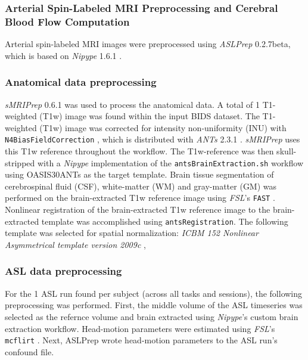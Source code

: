 \documentclass[]{article}
\date{}
\begin{document}
\hypertarget{arterial-spin-labeled-mri-preprocessing-and-cerebral-blood-flow-computation}{%
\subsubsection{Arterial Spin-Labeled MRI Preprocessing and Cerebral
Blood Flow
Computation}\label{arterial-spin-labeled-mri-preprocessing-and-cerebral-blood-flow-computation}}

Arterial spin-labeled MRI images were preprocessed using \emph{ASLPrep}
0.2.7beta, which is based on \emph{Nipype} 1.6.1 \citep{nipype}.

\hypertarget{anatomical-data-preprocessing}{%
\subsubsection{Anatomical data
preprocessing}\label{anatomical-data-preprocessing}}

\emph{sMRIPrep} 0.6.1 was used to process the anatomical data. A total
of 1 T1-weighted (T1w) image was found within the input BIDS dataset.
The T1-weighted (T1w) image was corrected for intensity non-uniformity
(INU) with \texttt{N4BiasFieldCorrection} \citep{n4}, which is
distributed with \emph{ANTs} 2.3.1 \citep{ants}. \emph{sMRIPrep} uses
this T1w reference throughout the workflow. The T1w-reference was then
skull-stripped with a \emph{Nipype} implementation of the
\texttt{antsBrainExtraction.sh} workflow using OASIS30ANTs as the target
template. Brain tissue segmentation of cerebrospinal fluid (CSF),
white-matter (WM) and gray-matter (GM) was performed on the
brain-extracted T1w reference image using \emph{FSL}'s \texttt{FAST}
\citep{fsl_fast}. Nonlinear registration of the brain-extracted T1w
reference image to the brain-extracted template was accomplished using
\texttt{antsRegistration}. The following template was selected for
spatial normalization: \emph{ICBM 152 Nonlinear Asymmetrical template
version 2009c} \citep{mni152nlin2009casym},

\hypertarget{asl-data-preprocessing}{%
\subsubsection{ASL data preprocessing}\label{asl-data-preprocessing}}

For the 1 ASL run found per subject (across all tasks and sessions), the
following preprocessing was performed. First, the middle volume of the
ASL timeseries was selected as the refernce volume and brain extracted
using \emph{Nipype}'s custom brain extraction workflow. Head-motion
parameters were estimated using \emph{FSL}'s \texttt{mcflirt}
\citep{mcflirt}. Next, ASLPrep wrote head-motion parameters to the ASL
run's confound file.
\end{document}
